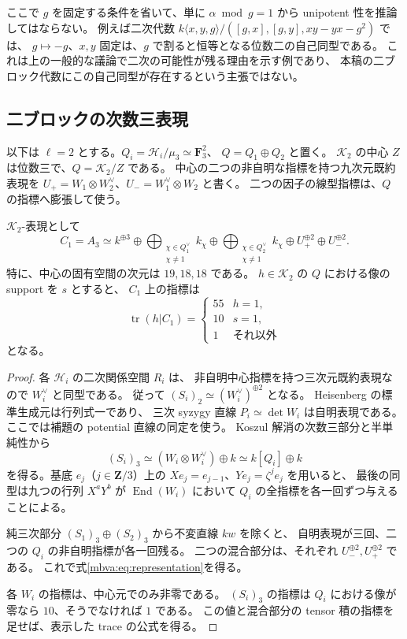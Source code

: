 ここで $g$ を固定する条件を省いて、単に
$\alpha\bmod g=1$ から unipotent 性を推論してはならない。
例えば二次代数
$k\langle x,y,g\rangle/([g,x],[g,y],xy-yx-g^2)$ では、
$g\mapsto-g$、$x,y$ 固定は、$g$ で割ると恒等となる位数二の自己同型である。
これは上の一般的な議論で二次の可能性が残る理由を示す例であり、
本稿の二ブロック代数にこの自己同型が存在するという主張ではない。

\subsection{二ブロックの次数三表現}

以下は $\ell=2$ とする。$Q_i=\mathcal H_i/\mu_3\simeq\mathbf F_3^2$、
$Q=Q_1\oplus Q_2$ と置く。
$\mathcal K_2$ の中心 $Z$ は位数三で、$Q=\mathcal K_2/Z$ である。
中心の二つの非自明な指標を持つ九次元既約表現を
$U_+=W_1\otimes W_2^\vee$、$U_-=W_1^\vee\otimes W_2$ と書く。
二つの因子の線型指標は、$Q$ の指標へ膨張して使う。

\begin{proposition}[五十五次元表現の完全な分解]
\label{mbva:prop:representation}
$\mathcal K_2$-表現として
\begin{equation}\label{mbva:eq:representation}
 C_1=A_3\simeq
 k^{\oplus3}
 \oplus\bigoplus_{\substack{\chi\in Q_1^\vee\\\chi\ne1}}k_\chi
 \oplus\bigoplus_{\substack{\chi\in Q_2^\vee\\\chi\ne1}}k_\chi
 \oplus U_+^{\oplus2}\oplus U_-^{\oplus2}.
\end{equation}
特に、中心の固有空間の次元は $19,18,18$ である。
$h\in\mathcal K_2$ の $Q$ における像の support を $s$ とすると、
$C_1$ 上の指標は
\[
 \operatorname{tr}(h|C_1)=
 \begin{cases}
 55&h=1,\\
 10&s=1,\\
 1&\text{それ以外}
 \end{cases}
\]
となる。
\end{proposition}
\begin{proof}
各 $\mathcal H_i$ の二次関係空間 $R_i$ は、
非自明中心指標を持つ三次元既約表現なので $W_i^\vee$ と同型である。
従って $(S_i)_2\simeq(W_i^\vee)^{\oplus2}$ となる。
Heisenberg の標準生成元は行列式一であり、
三次 syzygy 直線 $P_i\simeq\det W_i$ は自明表現である。
ここでは補題の potential 直線の同定を使う。
Koszul 解消の次数三部分と半単純性から
\[
 (S_i)_3\simeq(W_i\otimes W_i^\vee)\oplus k
             \simeq k[Q_i]\oplus k
\]
を得る。基底 $e_j$（$j\in\mathbf Z/3$）上の
$Xe_j=e_{j-1}$、$Ye_j=\zeta^je_j$ を用いると、
最後の同型は九つの行列 $X^aY^b$ が
$\operatorname{End}(W_i)$ において $Q_i$ の全指標を各一回ずつ与えることによる。

純三次部分 $(S_1)_3\oplus(S_2)_3$ から不変直線 $kw$ を除くと、
自明表現が三回、二つの $Q_i$ の非自明指標が各一回残る。
二つの混合部分は、それぞれ $U_-^{\oplus2},U_+^{\oplus2}$ である。
これで式\eqref{mbva:eq:representation}を得る。

各 $W_i$ の指標は、中心元でのみ非零である。
$(S_i)_3$ の指標は $Q_i$ における像が零なら $10$、そうでなければ $1$ である。
この値と混合部分の tensor 積の指標を足せば、表示した trace の公式を得る。
\end{proof}

